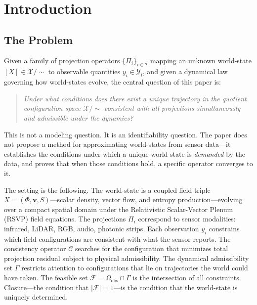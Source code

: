 \documentclass[11pt, oneside]{article}
\newcommand{\Xmod}{\mathcal{X}/{\sim}}
\begin{document}
\tableofcontents
\newpage

\section{Introduction}

\subsection{The Problem}

Given a family of projection operators $\{\Pi_i\}_{i \in \mathcal{I}}$ mapping an unknown
world-state $[X] \in \Xmod$ to observable quantities $y_i \in \mathcal{Y}_i$, and given a
dynamical law governing how world-states evolve, the central question of this paper is:

\begin{quote}
\textit{Under what conditions does there exist a unique trajectory in the quotient
configuration space $\Xmod$ consistent with all projections simultaneously and admissible
under the dynamics?}
\end{quote}

This is not a modeling question. It is an identifiability question. The paper does not
propose a method for approximating world-states from sensor data---it establishes the
conditions under which a unique world-state is \emph{demanded} by the data, and proves
that when those conditions hold, a specific operator converges to it.

The setting is the following. The world-state is a coupled field triple
$X = (\Phi, \mathbf{v}, S)$---scalar density, vector flow, and entropy
production---evolving over a compact spatial domain under the Relativistic Scalar-Vector
Plenum (RSVP) field equations. The projections $\Pi_i$ correspond to sensor modalities:
infrared, LiDAR, RGB, audio, photonic strips. Each observation $y_i$ constrains which
field configurations are consistent with what the sensor reports. The consistency operator
$\mathcal{C}$ searches for the configuration that minimizes total projection residual
subject to physical admissibility. The dynamical admissibility set $\Gamma$ restricts
attention to configurations that lie on trajectories the world could have taken. The
feasible set $\mathcal{F} = \Omega_{\mathrm{obs}} \cap \Gamma$ is the intersection of all
constraints. Closure---the condition that $|\mathcal{F}| = 1$---is the condition that the
world-state is uniquely determined.
\end{document}
